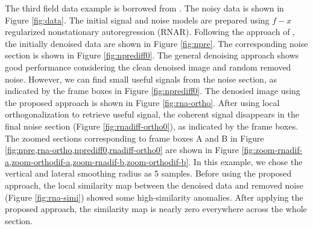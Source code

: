 
The third field data example is borrowed from \cite{guochang2012}. The noisy data is shown in Figure \ref{fig:data}. The initial signal and noise models are prepared using $f-x$ regularized nonstationary autoregression (RNAR). Following the approach of \cite{guochang2012}, the initially denoised data are shown in Figure \ref{fig:npre}. The corresponding noise section is shown in Figure \ref{fig:nprediff0}. The general denoising approach shows good performance considering the clean denoised image and random removed noise. However, we can find small useful signals from the noise section, as indicated by the frame boxes in Figure \ref{fig:nprediff0}. The denosied image using the proposed approach is shown in Figure \ref{fig:rna-ortho}. After using local orthogonalization to retrieve useful signal, the coherent signal disappears in the final noise section (Figure \ref{fig:rnadiff-ortho0}), as indicated by the frame boxes. The zoomed sections corresponding to frame boxes A and B in Figure \ref{fig:npre,rna-ortho,nprediff0,rnadiff-ortho0} are shown in Figure \ref{fig:zoom-rnadif-a,zoom-orthodif-a,zoom-rnadif-b,zoom-orthodif-b}. In this example, we chose the vertical and lateral smoothing radius as 5 samples. Before using the proposed approach, the local similarity map between the denoised data and removed noise (Figure \ref{fig:rna-simi}) showed  some high-similarity anomalies. After applying the proposed approach, the similarity map is nearly zero everywhere across the whole section.





